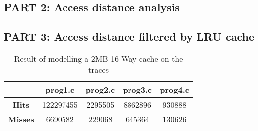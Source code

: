 \newpage
\subsection*{PART 2: Access distance analysis}

\subsection*{PART 3: Access distance filtered by LRU cache}
\begin{table}[h]
\centering
\begin{tabular}{ |c|c|c|c|c| } 
\hline
& \textbf{prog1.c} & \textbf{prog2.c} & \textbf{prog3.c} & \textbf{prog4.c} \\
\hline
\textbf{Hits}   & 122297455 & 2295505 & 8862896 & 930888 \\
\hline
\textbf{Misses} & 6690582   & 229068  & 645364  & 130626 \\
\hline
\end{tabular}
\caption{Result of modelling a 2MB 16-Way cache on the traces}
\end{table}